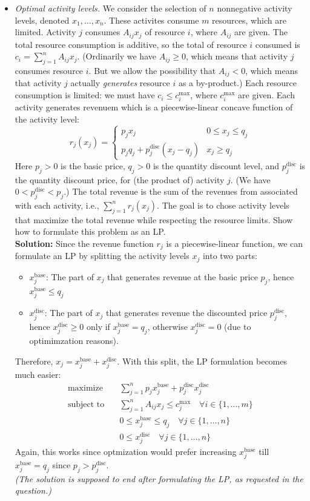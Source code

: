 \documentclass{article}
\newcommand{\disc}{\text{disc}}
\newcommand{\base}{\text{base}}
\begin{document}
\begin{itemize}
  \item[4.17] \textit{Optimal activity levels.} We consider the selection of $n$ nonnegative activity levels, denoted $x_1, \ldots, x_n$. These activites consume $m$ resources, which are limited. Activity $j$ consumes $A_{ij}x_j$ of resource $i$, where $A_{ij}$ are given. The total resource consumption is additive, so the total of resource $i$ consumed is $c_i = \sum_{j=1}^n A_{ij} x_j$. (Ordinarily we have $A_{ij} \ge 0$, which means that activity $j$ consumes resource $i$. But we allow the possibility that $A_{ij} < 0$, which means that activity $j$ actually \textit{generates} resource $i$ as a by-product.) Each resource consumption is limited: we must have $c_i \le c_i^{\max}$, where $c_i^{\max}$ are given. Each activity generates revenuem which is a piecewise-linear concave function of the activity level:
  \[ r_j(x_j) = \begin{cases} p_j x_j & 0 \le x_j \le q_j \\ p_j q_j + p_j^\disc(x_j - q_j) & x_j \ge q_j \end{cases} \]
  Here $p_j > 0$ is the basic price, $q_j > 0$ is the quantity discount level, and $p_j^\disc$ is the quantity discount price, for (the product of) activity $j$. (We have $0 < p_j^\disc < p_j$.) The total revenue is the sum of the revenues from associated with each activity, i.e., $\sum_{j=1}^n r_j(x_j)$. The goal is to chose activity levels that maximize the total revenue while respecting the resource limits. Show how to formulate this problem as an LP. \\
  \textbf{Solution:} Since the revenue function $r_j$ is a piecewise-linear function, we can formulate an LP by splitting the activity levels $x_j$ into two parts:
  \begin{itemize}
    \item $x_j^\base$: The part of $x_j$ that generates revenue at the basic price $p_j$, hence $x_j^\base \le q_j$
    \item $x_j^\disc$: The part of $x_j$ that generates revenue the discounted price $p_j^\disc$, hence $x_j^\disc \ge 0$ only if $x_j^\base = q_j$, otherwise $x_j^\disc = 0$ (due to optimimzation reasons).
  \end{itemize}
  Therefore, $x_j = x_j^\base + x_j^\disc$. With this split, the LP formulation becomes much easier:
  \begin{align*}
    \text{maximize} \quad & \sum_{j=1}^n p_j x_j^\base + p_j^\disc x_j^\disc \\
    \text{subject to} \quad & \sum_{j=1}^n A_{ij} x_j \le c_j^{\max} \quad \forall i \in \{1, \ldots, m\} \\
    & 0 \le x_j^\base \le q_j \quad \forall j \in \{1, \ldots, n\} \\
    & 0 \le x_j^\disc \quad \forall j \in \{1, \ldots, n\}
  \end{align*}
  Again, this works since optmization would prefer increasing $x_j^\base$ till $x_j^\base = q_j$ since $p_j > p_j^\disc$. \\
  \textit{(The solution is supposed to end after formulating the LP, as requested in the question.)}


\end{itemize}
\end{document}
